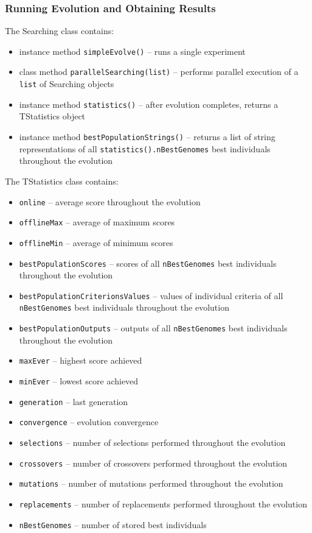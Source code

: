 \subsubsection{Running Evolution and Obtaining Results}
The Searching class contains:
\begin{itemize}
  \item instance method  \verb|simpleEvolve()| -- runs a single experiment
  \item class method \verb|parallelSearching(list)| -- performs parallel execution of a \verb|list| of Searching objects
  \item instance method \verb|statistics()| -- after evolution completes, returns a TStatistics object
  \item instance method \verb|bestPopulationStrings()| -- returns a list of string representations of all \verb|statistics().nBestGenomes| best individuals throughout the evolution
\end{itemize}

The TStatistics class contains:
\begin{itemize}
  \item \verb|online| -- average score throughout the evolution
  \item \verb|offlineMax| -- average of maximum scores
  \item \verb|offlineMin| -- average of minimum scores
  \item \verb|bestPopulationScores| -- scores of all \verb|nBestGenomes| best individuals throughout the evolution
  \item \verb|bestPopulationCriterionsValues| -- values of individual criteria of all \verb|nBestGenomes| best individuals throughout the evolution
  \item \verb|bestPopulationOutputs| -- outputs of all \verb|nBestGenomes| best individuals throughout the evolution
  \item \verb|maxEver| -- highest score achieved
  \item \verb|minEver| -- lowest score achieved
  \item \verb|generation| -- last generation
  \item \verb|convergence| -- evolution convergence
  \item \verb|selections| -- number of selections performed throughout the evolution
  \item \verb|crossovers| -- number of crossovers performed throughout the evolution
  \item \verb|mutations| -- number of mutations performed throughout the evolution
  \item \verb|replacements| -- number of replacements performed throughout the evolution
  \item \verb|nBestGenomes| -- number of stored best individuals\\
\end{itemize}

